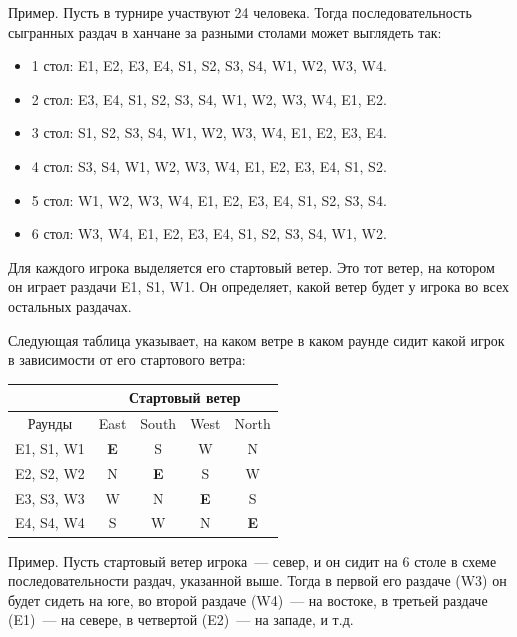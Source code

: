 \vspace{0.3cm}

Пример. Пусть в турнире участвуют 24 человека. Тогда последовательность сыгранных раздач в ханчане за разными столами может выглядеть так:

\begin{itemize}
	\item 1 стол: E1, E2, E3, E4, S1, S2, S3, S4, W1, W2, W3, W4.
	\item 2 стол: E3, E4, S1, S2, S3, S4, W1, W2, W3, W4, E1, E2.
	\item 3 стол: S1, S2, S3, S4, W1, W2, W3, W4, E1, E2, E3, E4.
	\item 4 стол: S3, S4, W1, W2, W3, W4, E1, E2, E3, E4, S1, S2.
	\item 5 стол: W1, W2, W3, W4, E1, E2, E3, E4, S1, S2, S3, S4.
	\item 6 стол: W3, W4, E1, E2, E3, E4, S1, S2, S3, S4, W1, W2.
\end{itemize}

\vspace{0.3cm}

Для каждого игрока выделяется его стартовый ветер. Это тот ветер, на котором он играет раздачи E1, S1, W1. Он определяет, какой ветер будет у игрока во всех остальных раздачах.

\vspace{0.3cm}

Следующая таблица указывает, на каком ветре в каком раунде сидит какой игрок в зависимости от его стартового ветра:

\begin{tabular}{|c|c|c|c|c|}
	\hline
	& \multicolumn{4}{c|}{Стартовый ветер} \\
	\hline
	Раунды & East & South & West & North \\
	\hline
	E1, S1, W1 & \textbf{E} & S & W & N \\
	\hline
	E2, S2, W2 & N & \textbf{E} & S & W \\
	\hline
	E3, S3, W3 & W & N & \textbf{E} & S \\
	\hline
	E4, S4, W4 & S & W & N & \textbf{E} \\
	\hline
\end{tabular}

\vspace{0.3cm}

Пример. Пусть стартовый ветер игрока~--- север, и он сидит на 6 столе в схеме последовательности раздач, указанной выше. Тогда в первой его раздаче (W3) он будет сидеть на юге, во второй раздаче (W4)~--- на востоке, в третьей раздаче (E1)~--- на севере, в четвертой (E2)~--- на западе, и т.д.

